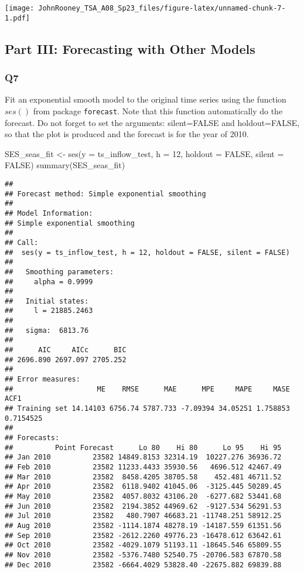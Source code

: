 \documentclass[
]{article}
\newenvironment{Shaded}{\begin{snugshade}}{\end{snugshade}}
\newcommand{\AttributeTok}[1]{\textcolor[rgb]{0.77,0.63,0.00}{#1}}
\newcommand{\ConstantTok}[1]{\textcolor[rgb]{0.00,0.00,0.00}{#1}}
\newcommand{\DecValTok}[1]{\textcolor[rgb]{0.00,0.00,0.81}{#1}}
\newcommand{\FunctionTok}[1]{\textcolor[rgb]{0.00,0.00,0.00}{#1}}
\newcommand{\NormalTok}[1]{#1}
\newcommand{\OtherTok}[1]{\textcolor[rgb]{0.56,0.35,0.01}{#1}}
\begin{document}
\texttt{[image: JohnRooney\_TSA\_A08\_Sp23\_files/figure-latex/unnamed-chunk-7-1.pdf]}

\hypertarget{part-iii-forecasting-with-other-models}{%
\subsection{Part III: Forecasting with Other
Models}\label{part-iii-forecasting-with-other-models}}

\hypertarget{q7}{%
\subsubsection{Q7}\label{q7}}

Fit an exponential smooth model to the original time series using the
function \(ses()\) from package \texttt{forecast}. Note that this
function automatically do the forecast. Do not forget to set the
arguments: silent=FALSE and holdout=FALSE, so that the plot is produced
and the forecast is for the year of 2010.

\begin{Shaded}
\begin{Highlighting}[]
\NormalTok{SES\_seas\_fit }\OtherTok{\textless{}{-}} \FunctionTok{ses}\NormalTok{(}\AttributeTok{y =}\NormalTok{ ts\_inflow\_test, }\AttributeTok{h =} \DecValTok{12}\NormalTok{, }\AttributeTok{holdout =} \ConstantTok{FALSE}\NormalTok{, }\AttributeTok{silent =} \ConstantTok{FALSE}\NormalTok{)}
\FunctionTok{summary}\NormalTok{(SES\_seas\_fit)}
\end{Highlighting}
\end{Shaded}

\begin{verbatim}
## 
## Forecast method: Simple exponential smoothing
## 
## Model Information:
## Simple exponential smoothing 
## 
## Call:
##  ses(y = ts_inflow_test, h = 12, holdout = FALSE, silent = FALSE) 
## 
##   Smoothing parameters:
##     alpha = 0.9999 
## 
##   Initial states:
##     l = 21885.2463 
## 
##   sigma:  6813.76
## 
##      AIC     AICc      BIC 
## 2696.890 2697.097 2705.252 
## 
## Error measures:
##                    ME    RMSE      MAE      MPE     MAPE     MASE      ACF1
## Training set 14.14103 6756.74 5787.733 -7.09394 34.05251 1.758853 0.7154525
## 
## Forecasts:
##          Point Forecast      Lo 80    Hi 80      Lo 95    Hi 95
## Jan 2010          23582 14849.8153 32314.19  10227.276 36936.72
## Feb 2010          23582 11233.4433 35930.56   4696.512 42467.49
## Mar 2010          23582  8458.4205 38705.58    452.481 46711.52
## Apr 2010          23582  6118.9402 41045.06  -3125.445 50289.45
## May 2010          23582  4057.8032 43106.20  -6277.682 53441.68
## Jun 2010          23582  2194.3852 44969.62  -9127.534 56291.53
## Jul 2010          23582   480.7907 46683.21 -11748.251 58912.25
## Aug 2010          23582 -1114.1874 48278.19 -14187.559 61351.56
## Sep 2010          23582 -2612.2260 49776.23 -16478.612 63642.61
## Oct 2010          23582 -4029.1079 51193.11 -18645.546 65809.55
## Nov 2010          23582 -5376.7480 52540.75 -20706.583 67870.58
## Dec 2010          23582 -6664.4029 53828.40 -22675.882 69839.88
\end{verbatim}
\end{document}
